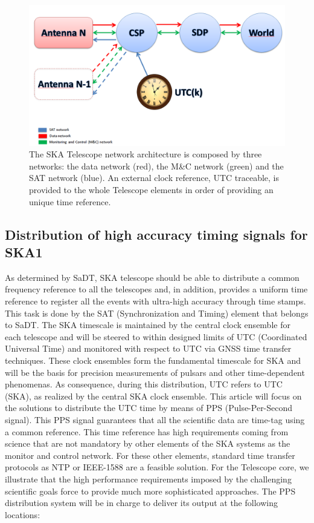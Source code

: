 \begin{figure}[H]
	\centering
	\includegraphics[scale=0.4]{img/ska_network_arch}
	\caption{The SKA Telescope network architecture is composed by three networks: the data network (red), the M\&C network (green) and the SAT network (blue). An external clock reference, UTC traceable, is provided to the whole Telescope elements in order of providing an unique time reference.}
	\label{fig:ska_net_arch1}
\end{figure}


\subsection{Distribution of high accuracy timing signals for SKA1}

As determined by SaDT, SKA telescope should be able to distribute a common frequency reference to all the telescopes and, in addition, provides a uniform time reference to register all the events with ultra-high accuracy through time stamps. This task is done by the SAT (Synchronization and Timing) element that belongs to SaDT. The SKA timescale is maintained by the central clock ensemble for each telescope and will be steered to within designed limits of UTC (Coordinated Universal Time) and monitored with respect to UTC via GNSS time transfer techniques. These clock ensembles form the fundamental timescale for SKA and will be the basis for precision measurements of pulsars and other time-dependent phenomenas. As consequence, during this distribution, UTC refers to UTC (SKA), as realized by the central SKA clock ensemble.
This article will focus on the solutions to distribute the UTC time by means of PPS (Pulse-Per-Second signal). This PPS signal guarantees that all the scientific data are time-tag using a common reference. This time reference has high requirements coming from science that are not mandatory by other elements of the SKA systems as the monitor and control network. For these other elements, standard time transfer protocols as NTP or IEEE-1588 are a feasible solution. For the Telescope core, we illustrate that the high performance requirements imposed by the challenging scientific goals force to provide much more sophisticated approaches. 
The PPS distribution system will be in charge to deliver its output at the following locations:

